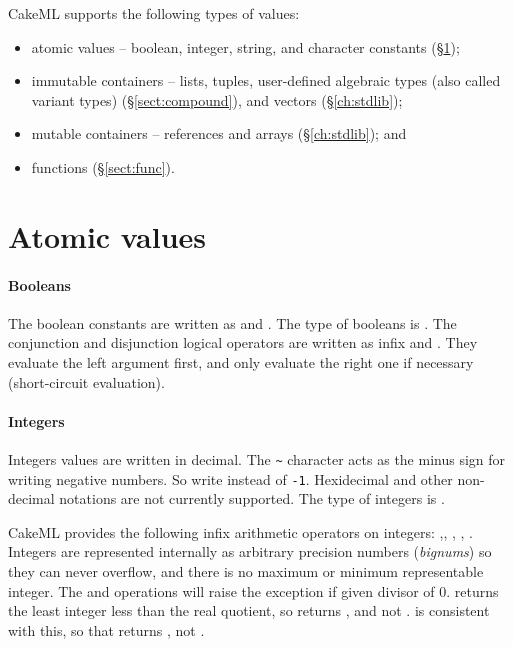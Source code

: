 \documentclass[12pt,a4paper]{book}
\begin{document}
CakeML supports the following types of values:
\begin{itemize}
  \item atomic values -- boolean, integer, string, and character constants (\S\ref{sect:val});
  \item immutable containers -- lists, tuples, user-defined algebraic types (also called variant types) (\S\ref{sect:compound}), and vectors (\S\ref{ch:stdlib});
  \item mutable containers -- references and arrays (\S\ref{ch:stdlib}); and
  \item functions (\S\ref{sect:func}).
\end{itemize}

\section{Atomic values}
\label{sect:val}

\paragraph{Booleans} The boolean constants are written as  and
. The type of booleans is . The conjunction and
disjunction logical operators are written as infix  and
. They evaluate the left argument first, and only evaluate the
right one if necessary (short-circuit evaluation).

\paragraph{Integers} Integers values are written in decimal. The
\texttt{\textasciitilde} character acts as the minus sign for writing negative
numbers. So write  instead of \texttt{-1}. Hexidecimal and other
non-decimal notations are not currently supported. The type of integers is
.

CakeML provides the following infix arithmetic operators on integers: \smlinline{+},\smlinline{-}, \smlinline{*}, , . Integers are represented internally as arbitrary precision numbers (\emph{bignums}) so they can never overflow, and there is no maximum or minimum representable integer. The  and  operations will raise the  exception if given divisor of 0.  returns the least integer less than the real quotient, so  returns , and not .  is consistent with this, so that  returns , not .
\end{document}
